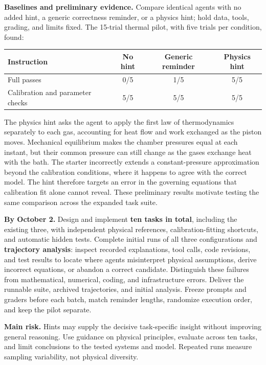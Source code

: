 \documentclass[11pt,letterpaper]{article}
\newcommand{\topic}[1]{\textbf{#1}\enspace}
\begin{document}
\topic{Baselines and preliminary evidence.}
Compare identical agents with no added hint, a generic correctness reminder, or a physics hint; hold data, tools, grading, and limits fixed.
The 15-trial thermal pilot, with five trials per condition, found:
\vspace{-3pt}
\begin{center}
\small
\begin{tabular}{@{}lccc@{}}
\toprule
Instruction & No hint & Generic reminder & Physics hint \\
\midrule
Full passes & 0/5 & 1/5 & 5/5 \\
Calibration and parameter checks & 5/5 & 5/5 & 5/5 \\
\bottomrule
\end{tabular}
\end{center}
\vspace{-7pt}
The physics hint asks the agent to apply the first law of thermodynamics separately to each gas, accounting for heat flow and work exchanged as the piston moves.
Mechanical equilibrium makes the chamber pressures equal at each instant, but their common pressure can still change as the gases exchange heat with the bath.
The starter incorrectly extends a constant-pressure approximation beyond the calibration conditions, where it happens to agree with the correct model.
The hint therefore targets an error in the governing equations that calibration fit alone cannot reveal.
These preliminary results motivate testing the same comparison across the expanded task suite.

\topic{By October 2.}
Design and implement \textbf{ten tasks in total}, including the existing three, with independent physical references, calibration-fitting shortcuts, and automatic hidden tests.
Complete initial runs of all three configurations and \textbf{trajectory analysis}: inspect recorded explanations, tool calls, code revisions, and test results to locate where agents misinterpret physical assumptions, derive incorrect equations, or abandon a correct candidate.
Distinguish these failures from mathematical, numerical, coding, and infrastructure errors.
Deliver the runnable suite, archived trajectories, and initial analysis. Freeze prompts and graders before each batch, match reminder lengths, randomize execution order, and keep the pilot separate.

\topic{Main risk.}
Hints may supply the decisive task-specific insight without improving general reasoning.
Use guidance on physical principles, evaluate across ten tasks, and limit conclusions to the tested systems and model. Repeated runs measure sampling variability, not physical diversity.
\end{document}
